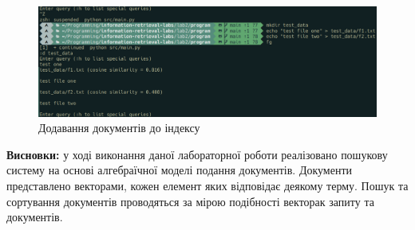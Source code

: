\documentclass{../../templates/information_retrieval_lab}
\begin{document}
\begin{figure}[H]
    \centering
    \includegraphics[width=\textwidth]{img/screen6.png}
    \caption{Додавання документів до індексу}
\end{figure}

\textbf{Висновки:} у ході виконання даної лабораторної роботи реалізовано пошукову систему на основі алгебраїчної моделі подання документів. Документи представлено векторами, кожен елемент яких відповідає деякому терму. Пошук та сортування документів проводяться за мірою подібності векторак запиту та документів.
\end{document}
